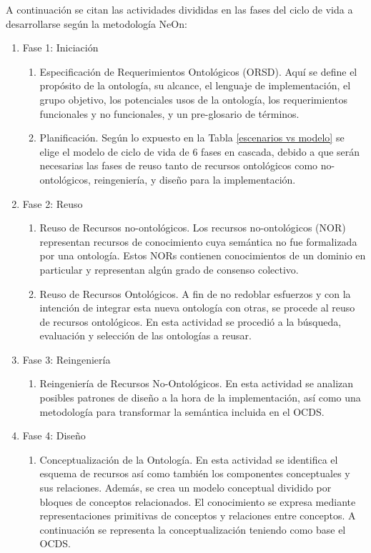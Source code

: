 A continuación se citan las actividades divididas en las fases del ciclo de vida a desarrollarse según la metodología NeOn:
\begin{enumerate}
\item Fase 1: Iniciación
    \begin{enumerate}
    \item Especificación de Requerimientos Ontológicos (ORSD). Aquí se define el propósito de la ontología, su alcance, el lenguaje de implementación, el grupo objetivo, los potenciales usos de la ontología, los requerimientos funcionales y no funcionales, y un pre-glosario de términos.

    \item Planificación. Según lo expuesto en la Tabla \ref{escenarios vs modelo} se elige el modelo de ciclo de vida de 6 fases en cascada, debido a que serán necesarias las fases de reuso tanto de recursos ontológicos como no-ontológicos, reingeniería, y diseño para la implementación.
 
    \end{enumerate}
\item Fase 2: Reuso
    \begin{enumerate}
    \item Reuso de Recursos  no-ontológicos. Los recursos no-ontológicos (NOR) representan recursos de conocimiento cuya semántica no fue formalizada por una ontología. Estos NORs contienen conocimientos de un dominio en particular y representan algún grado de consenso colectivo.

    \item Reuso de Recursos Ontológicos. A fin de no redoblar esfuerzos y con la intención de integrar esta nueva ontología con otras, se procede al reuso de recursos ontológicos. En esta actividad se procedió a la búsqueda, evaluación y selección de las ontologías a reusar.
    \end{enumerate}
\item Fase 3: Reingeniería
\begin{enumerate}
\item Reingeniería de Recursos No-Ontológicos. En esta actividad se analizan posibles patrones de diseño a la hora de la implementación, así como una metodología para transformar la semántica incluida en el OCDS.

\end{enumerate}
\item Fase 4: Diseño
\begin{enumerate}
\item Conceptualización de la Ontología. En esta actividad se identifica el esquema de recursos así como también los componentes conceptuales y sus relaciones. Además, se crea un modelo conceptual dividido por bloques de conceptos relacionados. El conocimiento se expresa mediante representaciones primitivas de conceptos y relaciones entre conceptos. A continuación se representa la conceptualización teniendo como base el OCDS. 


\end{enumerate}
\end{enumerate}
